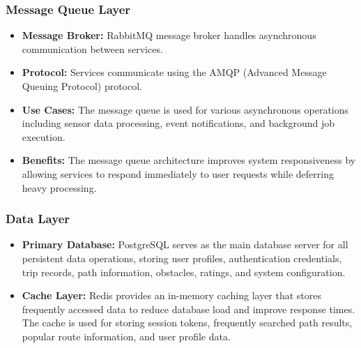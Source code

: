 \subsubsection{Message Queue Layer}
\begin{itemize}
    \item \textbf{Message Broker:} RabbitMQ message broker handles asynchronous communication between services.
    
    \item \textbf{Protocol:} Services communicate using the AMQP (Advanced Message Queuing Protocol) protocol.
    
    \item \textbf{Use Cases:} The message queue is used for various asynchronous operations including sensor data processing, event notifications, and background job execution.
    
    \item \textbf{Benefits:} The message queue architecture improves system responsiveness by allowing services to respond immediately to user requests while deferring heavy processing.
\end{itemize}

\subsubsection{Data Layer}
\begin{itemize}
    \item \textbf{Primary Database:} PostgreSQL serves as the main database server for all persistent data operations, storing user profiles, authentication credentials, trip records, path information, obstacles, ratings, and system configuration.
    
    \item \textbf{Cache Layer:} Redis provides an in-memory caching layer that stores frequently accessed data to reduce database load and improve response times. The cache is used for storing session tokens, frequently searched path results, popular route information, and user profile data.
\end{itemize}

